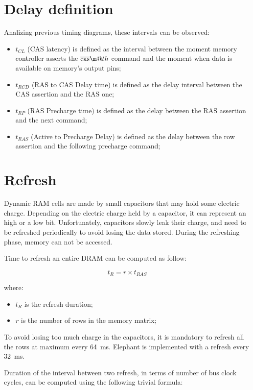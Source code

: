 \documentclass[a4paper,12pt]{article}
\makeatletter
\newcommand*{\textoverline}[1]{$\overline{\hbox{#1}}\m@th$}
\newcommand{\memoryname}{Elephant}
\makeatother
\begin{document}
\section{Delay definition}
Analizing previous timing diagrams, these intervals can be observed:
\begin{itemize}
  \item $t_{CL}$ (CAS latency) is defined as the interval between the moment memory controller asserts the \emph{\textoverline{cas}} command and the moment when data is available on memory's output pins;
  \item $t_{RCD}$ (RAS to CAS Delay time) is defined as the delay interval between the CAS assertion and the RAS one;
  \item $t_{RP}$ (RAS Precharge time) is defined as the delay between the RAS assertion and the next command;
  \item $t_{RAS}$ (Active to Precharge Delay) is defined as the delay between the row assertion and the following precharge command;
\end{itemize}

\section{Refresh}
Dynamic RAM cells are made by small capacitors that may hold some electric charge.
Depending on the electric charge held by a capacitor, it can represent an high or a low bit.
Unfortunately, capacitors slowly leak their charge, and need to be refreshed periodically to avoid losing the data stored.
During the refreshing phase, memory can not be accessed.

Time to refresh an entire DRAM can be computed as follow:

$$ t_{R} = r \times t_{RAS} $$

where:

\begin{itemize}
  \item $t_{R}$ is the refresh duration;
  \item $r$ is the number of rows in the memory matrix;
\end{itemize}

To avoid losing too much charge in the capacitors, it is mandatory to refresh all the rows at maximum every 64~ms.
\memoryname{} is implemented with a refresh every 32~ms.

Duration of the interval between two refresh, in terms of number of bus clock cycles, can be computed using the following trivial formula:
\end{document}
